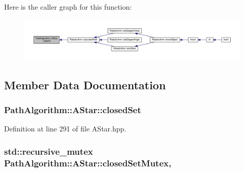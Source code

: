 Here is the caller graph for this function\+:
\nopagebreak
\begin{figure}[H]
\begin{center}
\leavevmode
\includegraphics[width=350pt]{class_path_algorithm_1_1_a_star_a09778c7ec09ee48c3a8088402a653cca_icgraph}
\end{center}
\end{figure}




\subsection{Member Data Documentation}
\subsubsection[{\texorpdfstring{closed\+Set}{closedSet}}]{ Path\+Algorithm\+::\+A\+Star\+::closed\+Set\hspace{0.3cm}{\ttfamily [private]}}\hypertarget{class_path_algorithm_1_1_a_star_ac30f7714d07594a6b75516daa0a26da7}{}\label{class_path_algorithm_1_1_a_star_ac30f7714d07594a6b75516daa0a26da7}


Definition at line 291 of file A\+Star.\+hpp.

\subsubsection[{\texorpdfstring{closed\+Set\+Mutex}{closedSetMutex}}]{\setlength{\rightskip}{0pt plus 5cm}std\+::recursive\+\_\+mutex Path\+Algorithm\+::\+A\+Star\+::closed\+Set\+Mutex\hspace{0.3cm}{\ttfamily [mutable]}, {\ttfamily [private]}}\hypertarget{class_path_algorithm_1_1_a_star_a1c8d2da0af60b0857bfd0abd3fa057ac}{}\label{class_path_algorithm_1_1_a_star_a1c8d2da0af60b0857bfd0abd3fa057ac}


